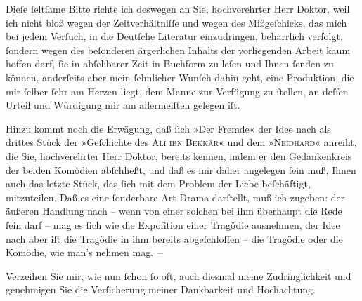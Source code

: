 \pstart
           Dieſe{ }ſeltſame Bitte richte ich deswe{\pb}gen an Sie,
               hochverehrter Herr Doktor, weil ich nicht bloß wegen der Zeitverhältniſſe und wegen
               des Mißgeſchicks, das mich bei jedem Verſuch, in die Deutſche Literatur einzudringen,
               beharrlich verfolgt,{ }ſondern wegen des beſonderen ärgerlichen Inhalts der
               vorliegenden Arbeit kaum hoffen darf,{ }ſie in abſehbarer Zeit in Buchform zu leſen und
               Ihnen{ }ſenden zu können, anderſeits aber mein{ }ſehnlicher Wunſch dahin geht, eine
               Produktion, die mir{ }ſelber{ }ſehr am Herzen liegt, dem Manne zur Verfügung zu{ }ſtellen,
               an deſſen Urteil und Würdigung mir am allermeiſten gelegen iſt.\pend
           
\pstart
           Hinzu kommt noch die Erwägung, daß{ }ſich »Der
                  Fremde« der Idee nach als drittes Stück der »Geſchichte des \textsc{Alî ibn Bekkâr}« und dem »\textsc{Neidhard}« anreiht, die Sie, hochverehrter Herr Doktor, bereits kennen, indem er den
               Gedankenkreis der beiden Komödien abſchließt, und daß es mir daher angelegen{ }ſein
               muß, Ihnen auch das letzte Stück, das{ }ſich mit {\pb}dem
               Problem der Liebe beſchäftigt, mitzuteilen. Daß es eine{ }ſonderbare Art Drama
               darſtellt, muß ich zugeben: der äußeren Handlung nach – wenn von einer solchen bei
               ihm überhaupt die Rede{ }ſein darf – mag es{ }ſich wie die Expoſition einer Tragödie
               ausnehmen, der Idee nach aber iſt die Tragödie in ihm bereits abgeſchloſſen – die
               Tragödie oder die Komödie, wie man’s nehmen mag. –\pend
           
\pstart
           Verzeihen Sie mir, wie nun{ }ſchon{ }ſo oft, auch diesmal meine Zudringlichkeit und
               genehmigen Sie die Verſicherung meiner Dankbarkeit und Hochachtung.\pend
           
